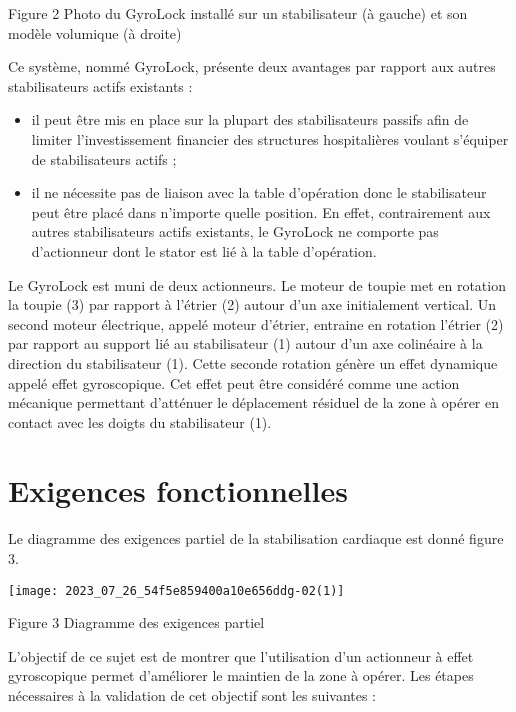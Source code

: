 Figure 2 Photo du GyroLock installé sur un stabilisateur (à gauche) et son modèle volumique (à droite)

Ce système, nommé GyroLock, présente deux avantages par rapport aux autres stabilisateurs actifs existants :

\begin{itemize}
  \item il peut être mis en place sur la plupart des stabilisateurs passifs afin de limiter l'investissement financier des structures hospitalières voulant s'équiper de stabilisateurs actifs ;

  \item il ne nécessite pas de liaison avec la table d'opération donc le stabilisateur peut être placé dans n'importe quelle position. En effet, contrairement aux autres stabilisateurs actifs existants, le GyroLock ne comporte pas d'actionneur dont le stator est lié à la table d'opération.

\end{itemize}

Le GyroLock est muni de deux actionneurs. Le moteur de toupie met en rotation la toupie (3) par rapport à l'étrier (2) autour d'un axe initialement vertical. Un second moteur électrique, appelé moteur d'étrier, entraine en rotation l'étrier (2) par rapport au support lié au stabilisateur (1) autour d'un axe colinéaire à la direction du stabilisateur (1). Cette seconde rotation génère un effet dynamique appelé effet gyroscopique. Cet effet peut être considéré comme une action mécanique permettant d'atténuer le déplacement résiduel de la zone à opérer en contact avec les doigts du stabilisateur (1).

\section{Exigences fonctionnelles}
Le diagramme des exigences partiel de la stabilisation cardiaque est donné figure 3.

\begin{center}
\texttt{[image: 2023\_07\_26\_54f5e859400a10e656ddg-02(1)]}
\end{center}

Figure 3 Diagramme des exigences partiel

L'objectif de ce sujet est de montrer que l'utilisation d'un actionneur à effet gyroscopique permet d'améliorer le maintien de la zone à opérer. Les étapes nécessaires à la validation de cet objectif sont les suivantes :

